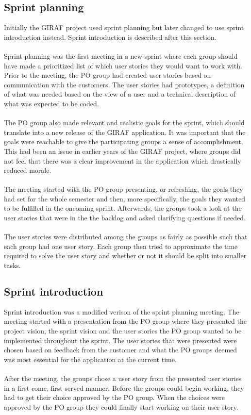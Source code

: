 \subsection{Sprint planning} \label{subsec:sprint-planning}
Initially the GIRAF project used sprint planning but later changed to use sprint introduction instead.
Sprint introduction is described after this section.
\\
\\
Sprint planning was the first meeting in a new sprint where each group should have made a prioritized list of which user stories they would want to work with.
Prior to the meeting, the PO group had created user stories based on communication with the customers.
The user stories had prototypes, a definition of what was needed based on the view of a user and a technical description of what was expected to be coded.
\\
\\
The PO group also made relevant and realistic goals for the sprint, which should translate into a new release of the GIRAF application.
It was important that the goals were reachable to give the participating groups a sense of accomplishment.
This had been an issue in earlier years of the GIRAF project, where groups did not feel that there was a clear improvement in the application which drastically reduced morale.
\\
\\
The meeting started with the PO group presenting, or refreshing, the goals they had set for the whole semester and then, more specifically, the goals they wanted to be fulfilled in the oncoming sprint.
Afterwards, the groups took a look at the user stories that were in the the backlog and asked clarifying questions if needed.
\\
\\
The user stories were distributed among the groups as fairly as possible such that each group had one user story.
Each group then tried to approximate the time required to solve the user story and whether or not it should be split into smaller tasks.


\subsection{Sprint introduction} \label{subsec:sprint-introduction}
Sprint introduction was a modified verison of the sprint planning meeting.
The meeting started with a presentation from the PO group where they presented the project vision, the sprint vision and the user stories the PO group wanted to be implemented throughout the sprint.
The user stories that were presented were chosen based on feedback from the customer and what the PO groups deemed was most essential for the application at the current time.
\\
\\
After the meeting, the groups chose a user story from the presented user stories in a first come, first served manner.
Before the groups could begin working, they had to get their choice approved by the PO group.
When the choices were approved by the PO group they could finally start working on their user story.

